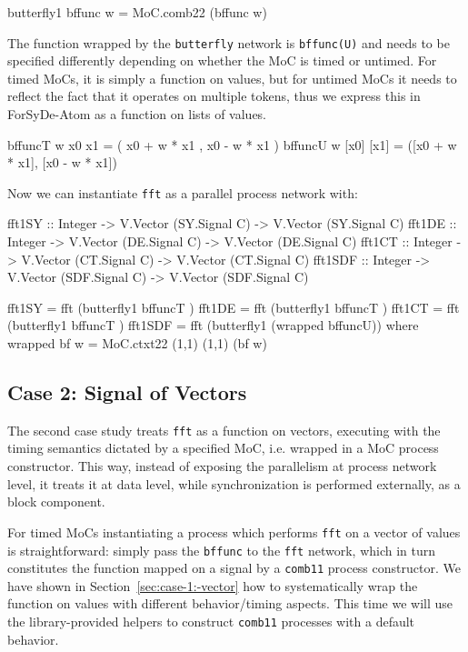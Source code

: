 \begin{code}
butterfly1 bffunc w = MoC.comb22 (bffunc w)
\end{code}

The function wrapped by the \texttt{butterfly} network is \texttt{bffunc(U)} and needs to be specified differently depending on whether the MoC is timed or untimed. For timed MoCs, it is simply a function on values, but for untimed MoCs it needs to reflect the fact that it operates on multiple tokens, thus we express this in ForSyDe-Atom as a function on lists of values.

\begin{code}
bffuncT w  x0   x1  = ( x0 + w * x1 ,  x0 - w * x1 )
bffuncU w [x0] [x1] = ([x0 + w * x1], [x0 - w * x1])
\end{code}

Now we can instantiate \texttt{fft} as a parallel process network with:

\begin{code}
fft1SY  :: Integer -> V.Vector (SY.Signal  C) -> V.Vector (SY.Signal  C)
fft1DE  :: Integer -> V.Vector (DE.Signal  C) -> V.Vector (DE.Signal  C)
fft1CT  :: Integer -> V.Vector (CT.Signal  C) -> V.Vector (CT.Signal  C)
fft1SDF :: Integer -> V.Vector (SDF.Signal C) -> V.Vector (SDF.Signal C)

fft1SY  = fft (butterfly1          bffuncT )
fft1DE  = fft (butterfly1          bffuncT )
fft1CT  = fft (butterfly1          bffuncT )
fft1SDF = fft (butterfly1 (wrapped bffuncU))
  where wrapped bf w = MoC.ctxt22 (1,1) (1,1) (bf w)
\end{code}

\subsection{Case 2: Signal of Vectors}
\label{sec:case-2:-signal}

The second case study treats \texttt{fft} as a function on vectors, executing with the timing semantics dictated by a specified MoC, i.e. wrapped in a MoC process constructor. This way, instead of exposing the parallelism at process network level, it treats it at data level, while synchronization is performed externally, as a block component.

For timed MoCs instantiating a process which performs \texttt{fft} on a vector of values is straightforward: simply pass the \texttt{bffunc} to the \texttt{fft} network, which in turn constitutes the function mapped on a signal by a \texttt{comb11} process constructor. We have shown in Section~\ref{sec:case-1:-vector} how to systematically wrap the function on values with different behavior/timing aspects. This time we will use the library-provided helpers to construct \texttt{comb11} processes with a default behavior.

